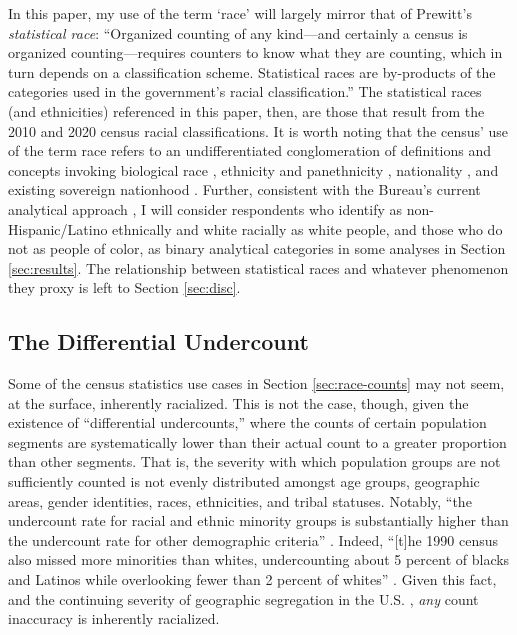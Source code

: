 In this paper, my use of the term `race' will largely mirror that of Prewitt's \textit{statistical race}: ``Organized counting of any kind---and certainly a census is organized counting---requires counters to know what they are counting, which in turn depends on a classification scheme. Statistical races are by-products of the categories used in the government’s racial classification.'' \cite{prewitt_what_2013} The statistical races (and ethnicities) referenced in this paper, then, are those that result from the 2010 and 2020 census racial classifications. It is worth noting that the census' use of the term race refers to an undifferentiated conglomeration of definitions and concepts invoking biological race \cite{prewitt_what_2013, quisumbing_king_recentering_2019}, ethnicity and panethnicity \cite{omi_racial_2014, espiritu_asian_1992, espiritu_who_2000}, nationality \cite{mezey_erasure_2002}, and existing sovereign nationhood \cite{byrd_been_2011}. Further, consistent with the Bureau's current analytical approach \cite{pack_note_1996, fox_differential_2018}, I will consider respondents who identify as non-Hispanic/Latino ethnically and white racially as white people, and those who do not as people of color, as binary analytical categories in some analyses in Section \ref{sec:results}. The relationship between statistical races and whatever phenomenon they proxy is left to Section \ref{sec:disc}.
  

\subsection{The Differential Undercount}

Some of the census statistics use cases in Section \ref{sec:race-counts} may not seem, at the surface, inherently racialized. This is not the case, though, given the existence of ``differential undercounts,'' where the counts of certain population segments are systematically lower than their actual count to a greater proportion than other segments. That is, the severity with which population groups are not sufficiently counted is not evenly distributed amongst age groups, geographic areas, gender identities, races, ethnicities, and tribal statuses. Notably, ``the undercount rate for racial and ethnic minority groups is substantially higher than the undercount rate for other demographic criteria'' \cite{fox_differential_2018}. Indeed, ``[t]he 1990 census also missed more minorities than whites, undercounting about 5 percent of blacks and Latinos while overlooking fewer than 2 percent of whites'' \cite{espiritu_asian_1992}. Given this fact, and the continuing severity of geographic segregation in the U.S. \cite{bonilla-silva_racism_2010}, \textit{any} count inaccuracy is inherently racialized. 

